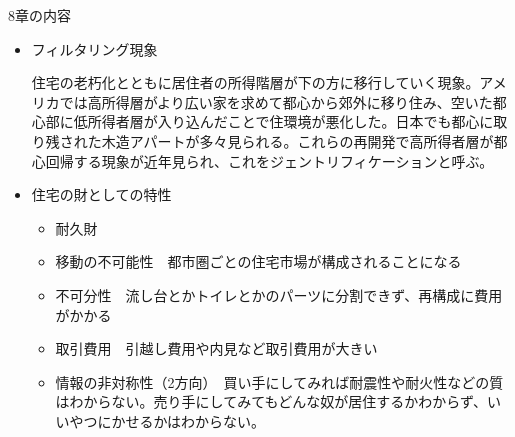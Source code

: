 \documentclass{jsarticle}
\begin{document}
8章の内容
\begin{itemize}
\item フィルタリング現象

住宅の老朽化とともに居住者の所得階層が下の方に移行していく現象。アメリカでは高所得層がより広い家を求めて都心から郊外に移り住み、空いた都心部に低所得者層が入り込んだことで住環境が悪化した。日本でも都心に取り残された木造アパートが多々見られる。これらの再開発で高所得者層が都心回帰する現象が近年見られ、これをジェントリフィケーションと呼ぶ。
\item 住宅の財としての特性
	\begin{itemize}
	\item 耐久財
	\item 移動の不可能性　都市圏ごとの住宅市場が構成されることになる
	\item 不可分性　流し台とかトイレとかのパーツに分割できず、再構成に費用がかかる
	\item 取引費用　引越し費用や内見など取引費用が大きい
	\item 情報の非対称性（2方向）　買い手にしてみれば耐震性や耐火性などの質はわからない。売り手にしてみてもどんな奴が居住するかわからず、いいやつにかせるかはわからない。
	\end{itemize}
\end{itemize}
\end{document}
